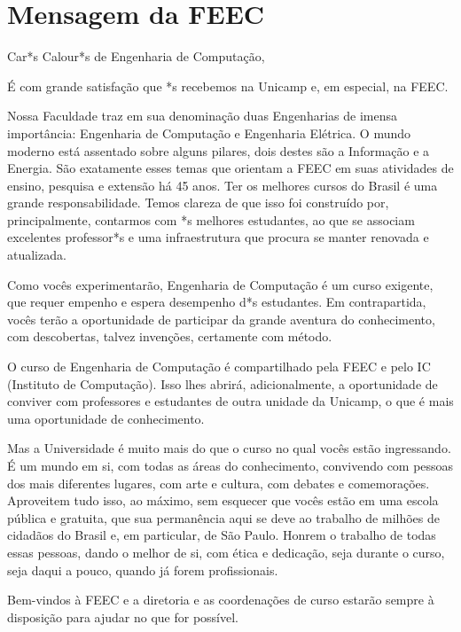 
\section{Mensagem da FEEC}


Car*s Calour*s de Engenharia de Computação,

É com grande satisfação que *s recebemos na Unicamp e, em especial, na FEEC.

Nossa Faculdade traz em sua denominação duas Engenharias de imensa importância:
Engenharia de Computação e Engenharia Elétrica.  O mundo moderno está assentado
sobre alguns pilares, dois destes são a Informação e a Energia.  São exatamente
esses temas que orientam a FEEC em suas atividades de ensino, pesquisa e
extensão há 45 anos. Ter os melhores cursos do Brasil é uma grande
responsabilidade. Temos clareza de que isso foi construído por, principalmente,
contarmos com *s melhores estudantes, ao que se associam excelentes professor*s
e uma infraestrutura que procura se manter renovada e atualizada.

Como vocês experimentarão, Engenharia de Computação é um curso exigente, que
requer empenho e espera desempenho d*s estudantes. Em contrapartida, vocês terão
a oportunidade de participar da grande aventura do conhecimento, com
descobertas, talvez invenções, certamente com método.

O curso de Engenharia de Computação é compartilhado pela FEEC e pelo IC
(Instituto de Computação). Isso lhes abrirá, adicionalmente, a oportunidade de
conviver com professores e estudantes de outra unidade da Unicamp, o que é mais
uma oportunidade de conhecimento.

Mas a Universidade é muito mais do que o curso no qual vocês estão ingressando.
É um mundo em si, com todas as áreas do conhecimento, convivendo com pessoas dos
mais diferentes lugares, com arte e cultura, com debates e comemorações.
Aproveitem tudo isso, ao máximo, sem esquecer que vocês estão em uma escola
pública e gratuita, que sua permanência aqui se deve ao trabalho de milhões de
cidadãos do Brasil e, em particular, de São Paulo. Honrem o trabalho de todas
essas pessoas, dando o melhor de si, com ética e dedicação, seja durante o
curso, seja daqui a pouco, quando já forem profissionais.

Bem-vindos à FEEC e a diretoria e as coordenações de curso estarão sempre à
disposição para ajudar no que for possível.

